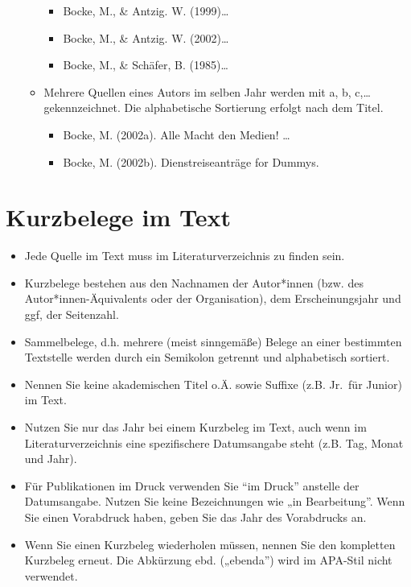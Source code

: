 \documentclass[
  letterpaper,
  DIV=11]{scrreprt}
\begin{document}
\begin{itemize}
\begin{itemize}
    \begin{itemize}
    \item
      Bocke, M., \& Antzig. W. (1999)\ldots{}
    \item
      Bocke, M., \& Antzig. W. (2002)\ldots{}
    \item
      Bocke, M., \& Schäfer, B. (1985)\ldots{}
    \end{itemize}
  \item
    Mehrere Quellen eines Autors im selben Jahr werden mit a, b,
    c,\ldots{} gekennzeichnet. Die alphabetische Sortierung erfolgt nach
    dem Titel.

    \begin{itemize}
    \item
      Bocke, M. (2002a). Alle Macht den Medien! \ldots{}
    \item
      Bocke, M. (2002b). Dienstreiseanträge for Dummys.
    \end{itemize}
  \end{itemize}
\end{itemize}

\hypertarget{kurzbelege-im-text}{%
\section{Kurzbelege im Text}\label{kurzbelege-im-text}}

\begin{itemize}
\item
  Jede Quelle im Text muss im Literaturverzeichnis zu finden sein.
\item
  Kurzbelege bestehen aus den Nachnamen der Autor*innen (bzw. des
  Autor*innen-Äquivalents oder der Organisation), dem Erscheinungsjahr
  und ggf, der Seitenzahl.
\item
  Sammelbelege, d.h. mehrere (meist sinngemäße) Belege an einer
  bestimmten Textstelle werden durch ein Semikolon getrennt und
  alphabetisch sortiert.
\item
  Nennen Sie keine akademischen Titel o.Ä. sowie Suffixe (z.B. Jr.~für
  Junior) im Text.
\item
  Nutzen Sie nur das Jahr bei einem Kurzbeleg im Text, auch wenn im
  Literaturverzeichnis eine spezifischere Datumsangabe steht (z.B. Tag,
  Monat und Jahr).
\item
  Für Publikationen im Druck verwenden Sie ``im Druck'' anstelle der
  Datumsangabe. Nutzen Sie keine Bezeichnungen wie „in Bearbeitung''.
  Wenn Sie einen Vorabdruck haben, geben Sie das Jahr des Vorabdrucks
  an.
\item
  Wenn Sie einen Kurzbeleg wiederholen müssen, nennen Sie den kompletten
  Kurzbeleg erneut. Die Abkürzung ebd. („ebenda'') wird im APA-Stil
  nicht verwendet.
\end{itemize}
\end{document}
